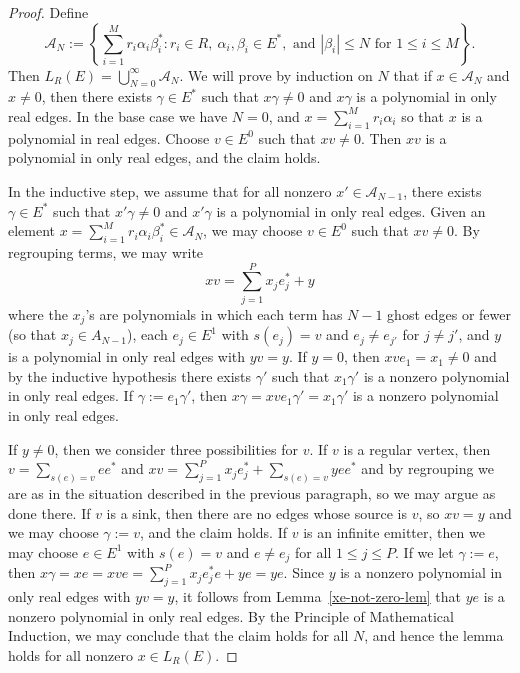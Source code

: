 \documentclass[11pt]{amsart}
\theoremstyle{remark}
\numberwithin{equation}{section}
\newcommand{\A}{\mathcal{A}}
\begin{document}
\begin{proof}
Define $$\A_N :=  \left\{ \sum_{i=1}^M r_i \alpha_i \beta_i^* :  r_i \in R, \ \alpha_i, \beta_i \in E^*, \text{ and }  | \beta_i | \leq N \text{ for } 1 \leq i \leq M \right\}.$$  Then $L_R(E) = \bigcup_{N=0}^\infty \A_N$.  We will prove by induction on $N$ that if $x \in \A_N$ and $x \neq 0$, then there exists $\gamma \in E^*$ such that $x \gamma \neq 0$ and $x \gamma$ is a polynomial in only real edges.  In the base case we have $N=0$, and $x = \sum_{i=1}^M r_i \alpha_i$ so that $x$ is a polynomial in real edges.  Choose $v \in E^0$ such that $xv \neq 0$.  Then $xv$ is a polynomial in only real edges, and the claim holds.

In the inductive step, we assume that for all nonzero $x' \in \A_{N-1}$, there exists $\gamma \in E^*$ such that $x' \gamma \neq 0$ and $x' \gamma$ is a polynomial in only real edges.  Given an element $x = \sum_{i=1}^M r_i \alpha_i \beta_i^* \in \A_N$, we may choose $v \in E^0$ such that $xv \neq 0$.    By regrouping terms, we may write $$xv = \sum_{j=1}^P  x_j e_j^* + y$$ where the $x_j$'s are polynomials in which each term has $N-1$ ghost edges or fewer (so that $x_j \in A_{N-1}$), each $e_j \in E^1$ with $s(e_j) = v$ and $e_j \neq e_{j'}$ for $j \neq j'$, and $y$ is a polynomial in only real edges with $yv = y$.  If $y = 0$, then $xve_1 = x_1 \neq 0$ and by the inductive hypothesis there exists $\gamma'$ such that $x_1 \gamma'$ is a nonzero polynomial in only real edges.  If $\gamma := e_1 \gamma'$, then $x \gamma = xve_1 \gamma' = x_1 \gamma'$ is a nonzero polynomial in only real edges.  

If $y \neq 0$, then we consider three possibilities for $v$.  If $v$ is a regular vertex, then $v = \sum_{s(e) = v} ee^*$ and $xv = \sum_{j=1}^P  x_j e_j^* + \sum_{s(e)=v} yee^*$ and by regrouping we are as in the situation described in the previous paragraph, so we may argue as done there.  If $v$ is a sink, then there are no edges whose source is $v$, so $xv = y$ and we may choose $\gamma := v$, and the claim holds.  If $v$ is an infinite emitter, then we may choose $e \in E^1$ with $s(e) = v$ and $e \neq e_j$ for all $1 \leq j \leq P$.  If we let $\gamma := e$, then $x\gamma = xe = xve = \sum_{j=1}^P  x_j e_j^*e + ye = ye$.  Since $y$ is a nonzero polynomial in only real edges with $yv=y$, it follows from Lemma~\ref{xe-not-zero-lem} that $ye$ is a nonzero polynomial in only real edges.  By the Principle of Mathematical Induction, we may conclude that the claim holds for all $N$, and hence the lemma holds for all nonzero $x \in L_R(E)$.
\end{proof}
\end{document}
